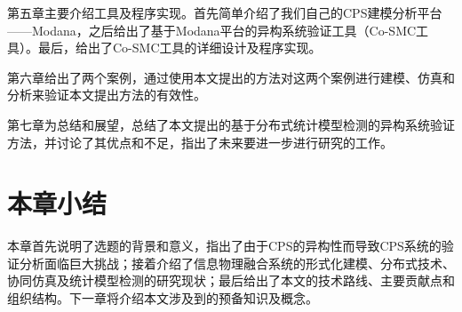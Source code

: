 第五章主要介绍工具及程序实现。首先简单介绍了我们自己的CPS建模分析平台——Modana，之后给出了基于Modana平台的异构系统验证工具（Co-SMC工具）。最后，给出了Co-SMC工具的详细设计及程序实现。

第六章给出了两个案例，通过使用本文提出的方法对这两个案例进行建模、仿真和分析来验证本文提出方法的有效性。

第七章为总结和展望，总结了本文提出的基于分布式统计模型检测的异构系统验证方法，并讨论了其优点和不足，指出了未来要进一步进行研究的工作。
\section{本章小结}
本章首先说明了选题的背景和意义，指出了由于CPS的异构性而导致CPS系统的验证分析面临巨大挑战；接着介绍了信息物理融合系统的形式化建模、分布式技术、协同仿真及统计模型检测的研究现状；最后给出了本文的技术路线、主要贡献点和组织结构。下一章将介绍本文涉及到的预备知识及概念。
